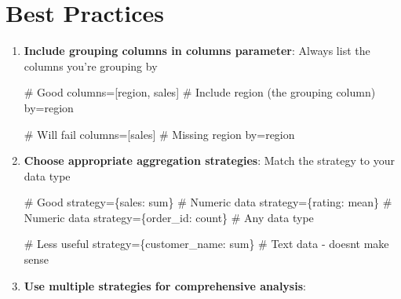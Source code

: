 \documentclass[
  letterpaper,
]{scrbook}
\newenvironment{Shaded}{\begin{snugshade}}{\end{snugshade}}
\newcommand{\CommentTok}[1]{\textcolor[rgb]{0.37,0.37,0.37}{#1}}
\newcommand{\NormalTok}[1]{\textcolor[rgb]{0.00,0.23,0.31}{#1}}
\newcommand{\OperatorTok}[1]{\textcolor[rgb]{0.37,0.37,0.37}{#1}}
\newcommand{\StringTok}[1]{\textcolor[rgb]{0.13,0.47,0.30}{#1}}
\begin{document}
\section{Best Practices}\label{best-practices-2}

\begin{enumerate}
\def\labelenumi{\arabic{enumi}.}
\item
  \textbf{Include grouping columns in columns parameter}: Always list
  the columns you're grouping by

\begin{Shaded}
\begin{Highlighting}[]
\CommentTok{\# Good}
\NormalTok{columns}\OperatorTok{=}\NormalTok{[}\StringTok{\textquotesingle{}region\textquotesingle{}}\NormalTok{, }\StringTok{\textquotesingle{}sales\textquotesingle{}}\NormalTok{]  }\CommentTok{\# Include \textquotesingle{}region\textquotesingle{} (the grouping column)}
\NormalTok{by}\OperatorTok{=}\StringTok{\textquotesingle{}region\textquotesingle{}}

\CommentTok{\# Will fail}
\NormalTok{columns}\OperatorTok{=}\NormalTok{[}\StringTok{\textquotesingle{}sales\textquotesingle{}}\NormalTok{]  }\CommentTok{\# Missing \textquotesingle{}region\textquotesingle{}}
\NormalTok{by}\OperatorTok{=}\StringTok{\textquotesingle{}region\textquotesingle{}}
\end{Highlighting}
\end{Shaded}
\item
  \textbf{Choose appropriate aggregation strategies}: Match the strategy
  to your data type

\begin{Shaded}
\begin{Highlighting}[]
\CommentTok{\# Good}
\NormalTok{strategy}\OperatorTok{=}\NormalTok{\{}\StringTok{\textquotesingle{}sales\textquotesingle{}}\NormalTok{: }\StringTok{\textquotesingle{}sum\textquotesingle{}}\NormalTok{\}  }\CommentTok{\# Numeric data}
\NormalTok{strategy}\OperatorTok{=}\NormalTok{\{}\StringTok{\textquotesingle{}rating\textquotesingle{}}\NormalTok{: }\StringTok{\textquotesingle{}mean\textquotesingle{}}\NormalTok{\}  }\CommentTok{\# Numeric data}
\NormalTok{strategy}\OperatorTok{=}\NormalTok{\{}\StringTok{\textquotesingle{}order\_id\textquotesingle{}}\NormalTok{: }\StringTok{\textquotesingle{}count\textquotesingle{}}\NormalTok{\}  }\CommentTok{\# Any data type}

\CommentTok{\# Less useful}
\NormalTok{strategy}\OperatorTok{=}\NormalTok{\{}\StringTok{\textquotesingle{}customer\_name\textquotesingle{}}\NormalTok{: }\StringTok{\textquotesingle{}sum\textquotesingle{}}\NormalTok{\}  }\CommentTok{\# Text data {-} doesn\textquotesingle{}t make sense}
\end{Highlighting}
\end{Shaded}
\item
  \textbf{Use multiple strategies for comprehensive analysis}:


\end{enumerate}
\end{document}
